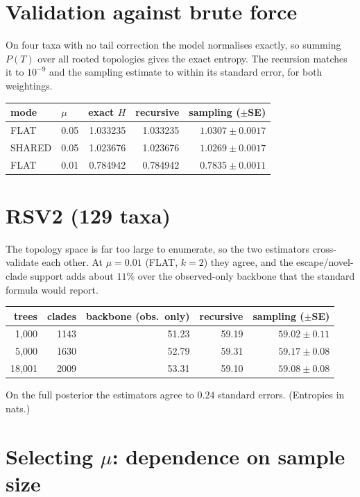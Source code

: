 \documentclass{article}
\begin{document}
\section*{Validation against brute force}

On four taxa with no tail correction the model normalises exactly, so summing
$P(T)$ over all rooted topologies gives the exact entropy. The recursion matches
it to $10^{-9}$ and the sampling estimate to within its standard error, for both
weightings.

\begin{center}
\begin{tabular}{llrrr}
\hline
mode & $\mu$ & exact $H$ & recursive & sampling ($\pm$SE)\\
\hline
FLAT   & 0.05 & 1.033235 & 1.033235 & $1.0307\pm0.0017$\\
SHARED & 0.05 & 1.023676 & 1.023676 & $1.0269\pm0.0017$\\
FLAT   & 0.01 & 0.784942 & 0.784942 & $0.7835\pm0.0011$\\
\hline
\end{tabular}
\end{center}

\section*{RSV2 (129 taxa)}

The topology space is far too large to enumerate, so the two estimators
cross-validate each other. At $\mu=0.01$ (FLAT, $k=2$) they agree, and the
escape/novel-clade support adds about $11\%$ over the observed-only backbone that
the standard formula would report.

\begin{center}
\begin{tabular}{rrrrr}
\hline
trees & clades & backbone (obs.\ only) & recursive & sampling ($\pm$SE)\\
\hline
1{,}000  & 1143 & 51.23 & 59.19 & $59.02\pm0.11$\\
5{,}000  & 1630 & 52.79 & 59.31 & $59.17\pm0.08$\\
18{,}001 & 2009 & 53.31 & 59.10 & $59.08\pm0.08$\\
\hline
\end{tabular}
\end{center}

\noindent
On the full posterior the estimators agree to $0.24$ standard errors. (Entropies
in nats.)

\section*{Selecting $\mu$: dependence on sample size}
\end{document}
